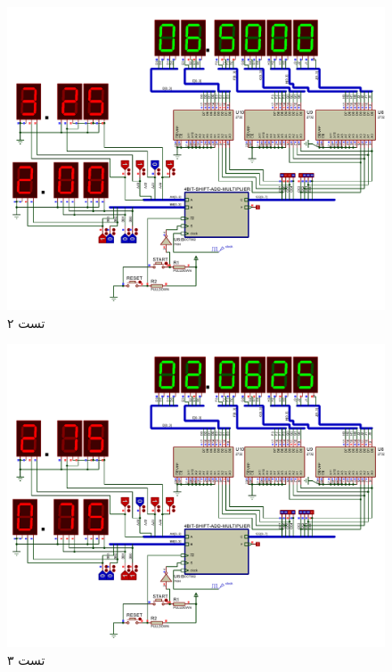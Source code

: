 \documentclass{article}
\begin{document}
\begin{figure}
	\centering
	\includegraphics[scale=0.5]{./graphics/test2}
	\caption{تست ۲}
\end{figure}


\begin{figure}
	\centering
	\includegraphics[scale=0.5]{./graphics/test3}
	\caption{تست ۳}
\end{figure}
\end{document}
